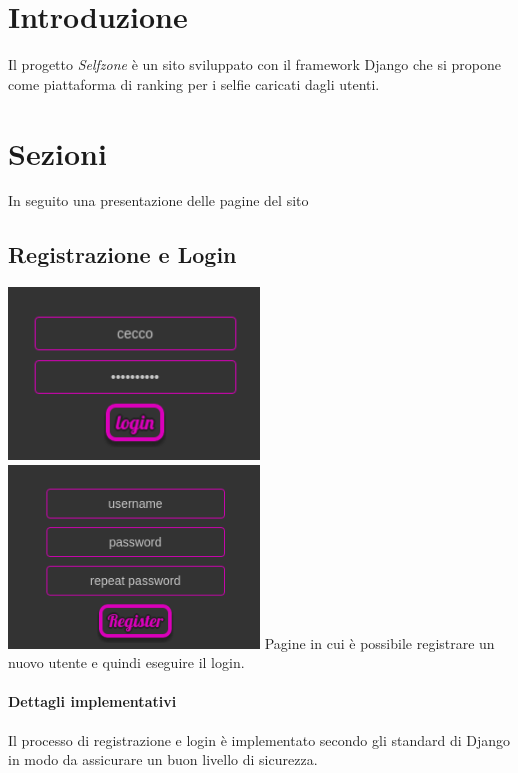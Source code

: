 \documentclass{article}
\newcommand{\proj}{\textit{Selfzone }}
\begin{document}
\section{Introduzione}
Il progetto \proj è un sito sviluppato con il framework Django che si propone come piattaforma di ranking per i selfie caricati dagli utenti.\\

\section{Sezioni}
In seguito una presentazione delle pagine del sito


\subsection{Registrazione e Login}
\includegraphics[width=0.5\textwidth, height=0.35\textwidth]{res/login.png}
\includegraphics[width=0.5\textwidth, height=0.35\textwidth]{res/register.png}
Pagine in cui è possibile registrare un nuovo utente e quindi eseguire il login.\\

\paragraph*{Dettagli implementativi}
Il processo di registrazione e login è implementato secondo gli standard di Django in modo da assicurare un buon livello di sicurezza.

\clearpage
\end{document}
